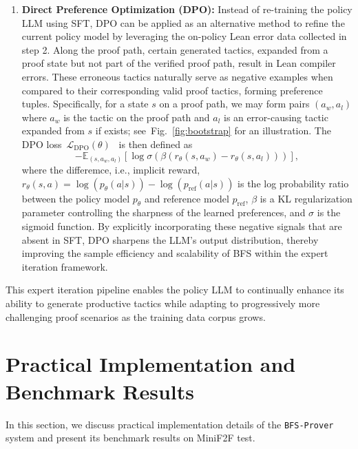 \documentclass[10pt,english]{article}
\begin{document}
\begin{enumerate}
    \item \textbf{Direct Preference Optimization (DPO):}  
    Instead of re-training the policy LLM using SFT, DPO can be applied as an alternative method to refine the current policy model by leveraging the on-policy Lean error data collected in step 2. Along the proof path, certain generated tactics, expanded from a proof state but not part of the verified proof path, result in Lean compiler errors. These erroneous tactics naturally serve as negative examples when compared to their corresponding valid proof tactics, forming preference tuples. Specifically, for a state $s$ on a proof path, we may form pairs $(a_w, a_l)$ where $a_w$ is the tactic on the proof path and $a_l$ is an error-causing tactic expanded from $s$ if exists; see~Fig.~\ref{fig:bootstrap} for an illustration. The DPO loss~$\mathcal{L}_{\text{DPO}}(\theta)$~\citep{dpo} is then defined as
    \[
    -\mathbb{E}_{(s,a_w,a_l)} \!\left[\log \sigma(\beta(r_\theta(s,a_w) - r_\theta(s,a_l)))\right]\!,
    \]
    where the differemce, i.e., implicit reward, $r_\theta(s,a) = \log(p_\theta(a|s)) - \log(p_{\text{ref}}(a|s))$ is the log probability ratio between the policy model $p_\theta$ and reference model $p_{\text{ref}}$, $\beta$ is a KL regularization parameter controlling the sharpness of the learned preferences, and $\sigma$ is the sigmoid function. By explicitly incorporating these negative signals that are absent in SFT, DPO sharpens the LLM's output distribution, thereby improving the sample efficiency and scalability of BFS within the expert iteration framework.


\end{enumerate}

This expert iteration pipeline enables the policy LLM to continually enhance its ability to generate productive tactics while adapting to progressively more challenging proof scenarios as the training data corpus grows.

\section{Practical Implementation and Benchmark Results}\label{sec:imp}
\label{sec:methodology}
In this section, we discuss practical implementation details of the \texttt{BFS-Prover} system and present its benchmark results on MiniF2F test.
\end{document}
